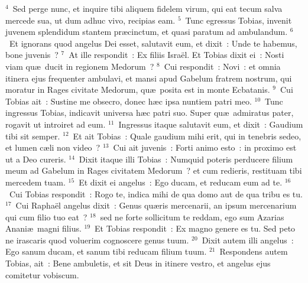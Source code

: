 ${}^{4}$~Sed perge nunc, et inquire tibi aliquem fidelem virum, qui eat tecum salva mercede sua, ut dum adhuc vivo, recipias eam.
${}^{5}$~Tunc egressus Tobias, invenit juvenem splendidum stantem pr\ae cinctum, et quasi paratum ad ambulandum.
${}^{6}$~Et ignorans quod angelus Dei esset, salutavit eum, et dixit~: Unde te habemus, bone juvenis~?
${}^{7}$~At ille respondit~: Ex filiis Isra\"el. Et Tobias dixit ei~: Nosti viam qu\ae\ ducit in regionem Medorum~?
${}^{8}$~Cui respondit~: Novi~: et omnia itinera ejus frequenter ambulavi, et mansi apud Gabelum fratrem nostrum, qui moratur in Rages civitate Medorum, qu\ae\ posita est in monte Ecbatanis.
${}^{9}$~Cui Tobias ait~: Sustine me obsecro, donec h\ae c ipsa nuntiem patri meo.
${}^{10}$~Tunc ingressus Tobias, indicavit universa h\ae c patri suo. Super qu\ae\ admiratus pater, rogavit ut introiret ad eum.
${}^{11}$~Ingressus itaque salutavit eum, et dixit~: Gaudium tibi sit semper.
${}^{12}$~Et ait Tobias~: Quale gaudium mihi erit, qui in tenebris sedeo, et lumen c\ae li non video~?
${}^{13}$~Cui ait juvenis~: Forti animo esto~: in proximo est ut a Deo cureris.
${}^{14}$~Dixit itaque illi Tobias~: Numquid poteris perducere filium meum ad Gabelum in Rages civitatem Medorum~? et cum redieris, restituam tibi mercedem tuam.
${}^{15}$~Et dixit ei angelus~: Ego ducam, et reducam eum ad te.
${}^{16}$~Cui Tobias respondit~: Rogo te, indica mihi de qua domo aut de qua tribu es tu.
${}^{17}$~Cui Rapha\"el angelus dixit~: Genus qu\ae ris mercenarii, an ipsum mercenarium qui cum filio tuo eat~?
${}^{18}$~sed ne forte sollicitum te reddam, ego sum Azarias Anani\ae\ magni filius.
${}^{19}$~Et Tobias respondit~: Ex magno genere es tu. Sed peto ne irascaris quod voluerim cognoscere genus tuum.
${}^{20}$~Dixit autem illi angelus~: Ego sanum ducam, et sanum tibi reducam filium tuum.
${}^{21}$~Respondens autem Tobias, ait~: Bene ambuletis, et sit Deus in itinere vestro, et angelus ejus comitetur vobiscum.


